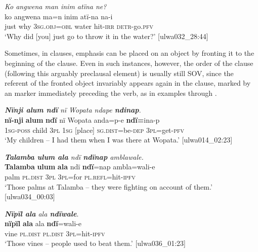 \ea%
    \label{ex:clause:20}
          \textit{Ko angwena man inim atïna ne?}\\
\gll    ko  angwena  ma=n      inim  atï-na  na-i\\
    just  why    3\textsc{sg.obj=obl}  water  hit-\textsc{irr}  \textsc{detr-}go.\textsc{pfv}\\
\glt `Why did [you] just go to throw it in the water?’ [ulwa032\_28:44]
\z

Sometimes, in  clauses, emphasis can be placed on an object by fronting it to the beginning of the clause. Even in such instances, however, the order of the clause (following this arguably preclausal element) is usually still SOV, since the referent of the fronted object invariably appears again in the clause, marked by an  marker immediately preceding the verb, as in examples  through .

\ea%
    \label{ex:clause:21}
          \textit{\textbf{Nïnji alum ndï} nï Wopata ndape \textbf{ndinap}}.\\
\gll \textbf{nï-nji}    \textbf{alum}  \textbf{ndï}  nï    Wopata  anda=p-e   \textbf{ndï=}ina-p\\
    1\textsc{sg-poss}  child  \textsc{3pl}  \textsc{1sg}  [place]    \textsc{sg.dist}=be\textsc{{}-dep}    3\textsc{pl}=get-\textsc{pfv}\\
\glt `My children -- I had them when I was there at Wopata.’ [ulwa014\_02:23]
\z

\ea%
    \label{ex:clause:22}
          \textit{\textbf{Talamba ulum ala} ndï \textbf{ndïnap} amblawale.}\\
\gll    \textbf{Talamba}  \textbf{ulum}  \textbf{ala}      ndï  \textbf{ndï}=nap  ambla=wali{}-e\\
    [place]    palm  \textsc{pl.dist}  \textsc{3pl}  \textsc{3pl=}for  \textsc{pl.refl}=hit-\textsc{ipfv}\\
\glt `Those palms at Talamba -- they were fighting on account of them.’ [ulwa034\_00:03]
\z

\ea%
    \label{ex:clause:23}
          \textit{\textbf{Nïpïl ala} ala \textbf{ndïwale}}.\\
\gll \textbf{nïpïl}  \textbf{ala}      ala      \textbf{ndï}=wali{}-e\\
    vine  \textsc{pl.dist}  \textsc{pl.dist}  \textsc{3pl=}hit-\textsc{ipfv}\\
\glt `Those vines -- people used to beat them.’ [ulwa036\_01:23]
\z

